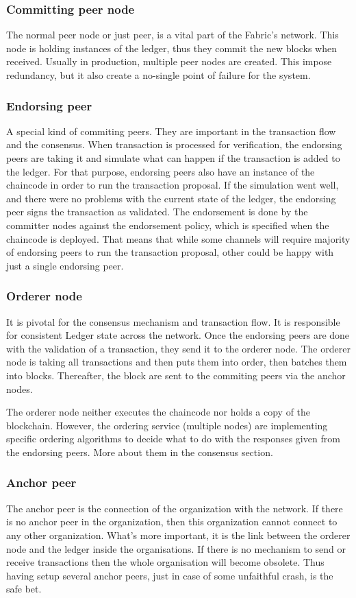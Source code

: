\documentclass[a4paper,11pt]{report}
\begin{document}
\subsubsection{Committing peer node}
The normal peer node or just peer, is a vital part of the Fabric’s network. This node is holding instances of the ledger, thus they commit the new blocks when received. Usually in production, multiple peer nodes are created. This impose redundancy, but it also create a no-single point of failure for the system. 
\subsubsection{Endorsing peer}
A special kind of commiting peers. They are important in the transaction flow and the consensus. When transaction is processed for verification, the endorsing peers are taking it and simulate what can happen if the transaction is added to the ledger. For that purpose, endorsing peers also have an instance of the chaincode in order to run the transaction proposal. If the simulation went well, and there were no problems with the current state of the ledger, the endorsing peer signs the transaction as validated. The endorsement is done by the committer nodes against the endorsement policy, which is specified when the chaincode is deployed. That means that while some channels will require majority of endorsing peers to run the transaction proposal, other could be happy with just a single endorsing peer.

\subsubsection{Orderer node}
It is pivotal for the consensus mechanism and transaction flow. It is responsible for consistent Ledger state across the network. Once the endorsing peers are done with the validation of a transaction, they send it to the orderer node. The orderer node is taking all transactions and then puts them into order, then batches them into blocks. Thereafter, the block are sent to the commiting peers via the anchor nodes.

	The orderer node neither executes the chaincode nor holds a copy of the blockchain. However, the ordering service (multiple nodes) are implementing specific ordering algorithms to decide what to do with the responses given from the endorsing peers. More about them in the consensus section.
\subsubsection{Anchor peer}
The anchor peer is the connection of the organization with the network. If there is no anchor peer in the organization, then this organization cannot connect to any other organization. What’s more important, it is the link between the orderer node and the ledger inside the organisations. If there is no mechanism to send or receive transactions then the whole organisation will become obsolete. Thus having setup several anchor peers, just in case of some unfaithful crash, is the safe bet.  
\end{document}
